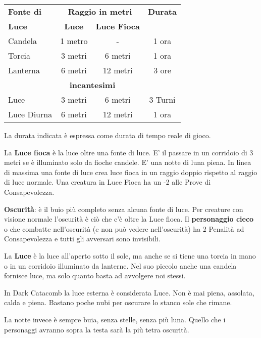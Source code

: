 \documentclass[12pt,a4paper,twoside,openany]{book}
\begin{document}
\begin{multicols}{2}
\begin{tabular}{l|cc|c}
\textbf{Fonte di} &\multicolumn{2}{c}{\textbf{Raggio in metri}}& \textbf{Durata}  \\
\textbf{Luce}& \textbf{Luce} & \textbf{Luce Fioca} &\\
\toprule
Candela  & 1 metro & -  & 1 ora\\
Torcia & 3 metri & 6 metri  & 1 ora\\
Lanterna & 6 metri & 12 metri  & 3 ore \\
\multicolumn{4}{c}{\textbf{incantesimi}}\\
Luce  & 3 metri & 6 metri  &3 Turni \\
Luce Diurna  & 6 metri & 12 metri & 1 ora \\
\end{tabular}

La durata indicata è espressa come durata di tempo reale di gioco.

\medskip

La \textbf{Luce fioca} è la luce oltre una fonte di luce. E' il passare in un corridoio di 3 metri se è illuminato solo da fioche candele. E' una notte di luna piena.
In linea di massima una fonte di luce crea luce fioca in un raggio doppio rispetto al raggio di luce normale. Una creatura in Luce Fioca ha un -2 alle Prove di Consapevolezza.

\medskip

\textbf{Oscurità}: è il buio più completo senza alcuna fonte di luce. Per creature con visione normale l'oscurità è ciò che c'è oltre la Luce fioca.
Il \textbf{personaggio cieco} o che combatte nell'oscurità (e non può vedere nell'oscurità) ha 2 Penalità ad Consapevolezza e tutti gli avversari sono invisibili.

\medskip

La \textbf{Luce} è la luce all'aperto sotto il sole, ma anche se si tiene una torcia in mano o in un corridoio illuminato da lanterne. Nel suo piccolo anche una candela fornisce luce, ma solo quanto basta ad avvolgere noi stessi.


\begin{narratore}
In Dark Catacomb la luce esterna è considerata Luce. Non è mai piena, assolata, calda e piena. Bastano poche nubi per oscurare lo stanco sole che rimane.

La notte invece è sempre buia, senza stelle, senza più luna. Quello che i personaggi avranno sopra la testa sarà la più tetra oscurità.\end{narratore}



\end{multicols}
\end{document}
